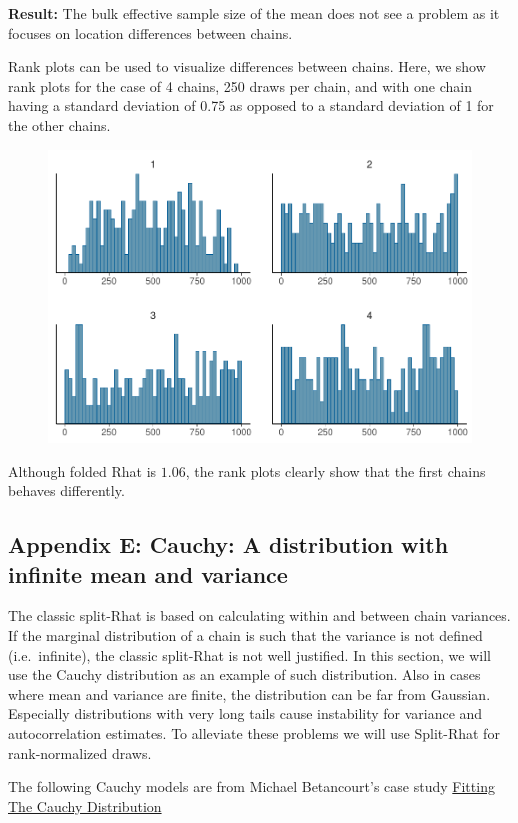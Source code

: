 \documentclass[american,]{article}
\begin{document}
\textbf{Result:} The bulk effective sample size of the mean does not see
a problem as it focuses on location differences between chains.

Rank plots can be used to visualize differences between chains. Here, we
show rank plots for the case of 4 chains, 250 draws per chain, and with
one chain having a standard deviation of 0.75 as opposed to a standard
deviation of 1 for the other chains.

\begin{figure}[t]
  \centering
  \includegraphics[width=0.6\linewidth]{graphics/hist-scaled-chain-1.pdf}
\end{figure}

Although folded Rhat is \(1.06\), the rank plots clearly show that the
first chains behaves differently.

\hypertarget{AppendixE}{%
\subsection*{Appendix E: Cauchy: A distribution with infinite mean and
variance}\label{AppendixE}}

The classic split-Rhat is based on calculating within and between chain
variances. If the marginal distribution of a chain is such that the
variance is not defined (i.e.~infinite), the classic split-Rhat is not
well justified. In this section, we will use the Cauchy distribution as
an example of such distribution. Also in cases where mean and variance
are finite, the distribution can be far from Gaussian. Especially
distributions with very long tails cause instability for variance and
autocorrelation estimates. To alleviate these problems we will use
Split-Rhat for rank-normalized draws.

The following Cauchy models are from Michael Betancourt's case study
\href{https://betanalpha.github.io/assets/case_studies/fitting_the_cauchy.html}{Fitting
The Cauchy Distribution}
\end{document}
